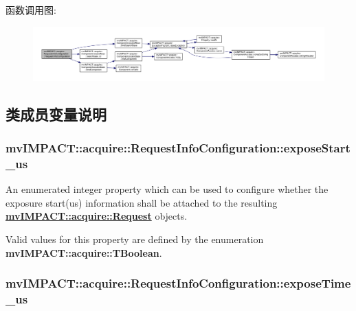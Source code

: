 函数调用图\+:
\nopagebreak
\begin{figure}[H]
\begin{center}
\leavevmode
\includegraphics[width=350pt]{classmv_i_m_p_a_c_t_1_1acquire_1_1_request_info_configuration_ada3a8f1d27c9a51d603ae3225c9c14d9_cgraph}
\end{center}
\end{figure}




\subsection{类成员变量说明}
\hypertarget{classmv_i_m_p_a_c_t_1_1acquire_1_1_request_info_configuration_a8a9346db78d37ad1e9809bd0bd65342b}{
\subsubsection[{expose\+Start\+\_\+us}]{ mv\+I\+M\+P\+A\+C\+T\+::acquire\+::\+Request\+Info\+Configuration\+::expose\+Start\+\_\+us}}\label{classmv_i_m_p_a_c_t_1_1acquire_1_1_request_info_configuration_a8a9346db78d37ad1e9809bd0bd65342b}


An enumerated integer property which can be used to configure whether the exposure start(us) information shall be attached to the resulting {\bfseries \hyperlink{classmv_i_m_p_a_c_t_1_1acquire_1_1_request}{mv\+I\+M\+P\+A\+C\+T\+::acquire\+::\+Request}} objects. 

Valid values for this property are defined by the enumeration {\bfseries mv\+I\+M\+P\+A\+C\+T\+::acquire\+::\+T\+Boolean}. \hypertarget{classmv_i_m_p_a_c_t_1_1acquire_1_1_request_info_configuration_a059547e3e05d693271cc225d7b6dcd81}{
\subsubsection[{expose\+Time\+\_\+us}]{ mv\+I\+M\+P\+A\+C\+T\+::acquire\+::\+Request\+Info\+Configuration\+::expose\+Time\+\_\+us}}\label{classmv_i_m_p_a_c_t_1_1acquire_1_1_request_info_configuration_a059547e3e05d693271cc225d7b6dcd81}


